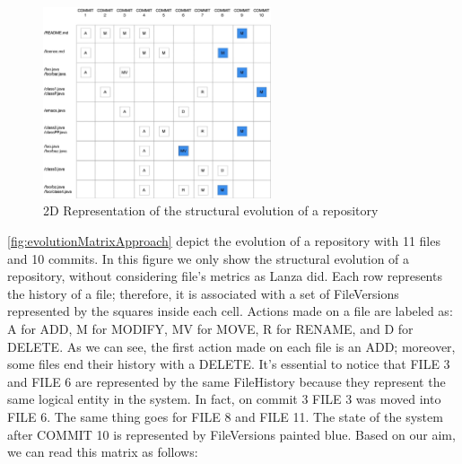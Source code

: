 \begin{figure}
    \center
    \includegraphics[width=0.6\textwidth]{2DMatrix.jpg}
    \caption{2D Representation of the structural evolution of a repository}
    \label{fig:evolutionMatrixApproach}
\end{figure}
\autoref{fig:evolutionMatrixApproach} depict the evolution of a repository with 11 files and 10 commits. In this figure we only show the structural evolution of a repository, without considering file's metrics as Lanza did. 
Each row represents the history of a file; therefore, it is associated with a set of FileVersions represented by the squares inside each cell. Actions made on a file are labeled as: A for ADD, M for MODIFY, MV for MOVE, R for RENAME, and D for DELETE.
As we can see, the first action made on each file is an ADD; moreover, some files end their history with a DELETE. It's essential to notice that FILE 3 and FILE 6 are represented by the same FileHistory because they represent the same logical entity in the system. In fact, on commit 3 FILE 3 was moved into FILE 6. The same thing goes for FILE 8 and FILE 11. 
The state of the system after COMMIT 10 is represented by FileVersions painted blue. 
\bigbreak
Based on our aim, we can read this matrix as follows:
